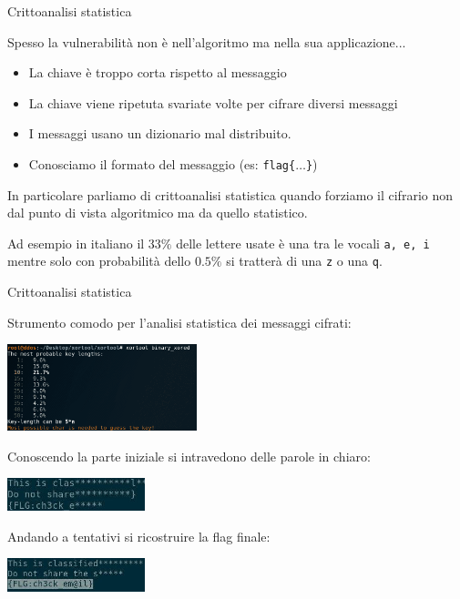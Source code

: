 \documentclass[handout, xcolor=dvipsnames,aspectratio=169]{beamer}
\begin{document}
\begin{frame}{Crittoanalisi statistica}

  \pause
  
  Spesso la vulnerabilità non è nell'algoritmo ma nella sua applicazione...
  
  \pause

  \medskip

  \begin{itemize}
    \item La chiave è troppo corta rispetto al messaggio
    \item La chiave viene ripetuta svariate volte per cifrare diversi messaggi
    \item I messaggi usano un dizionario mal distribuito.
    \item Conosciamo il formato del messaggio (es: \texttt{flag\{$\ldots$\}})
  \end{itemize}
  
  \medskip
  
  \pause

  In particolare parliamo di crittoanalisi statistica quando forziamo il cifrario non dal punto di vista algoritmico ma da quello statistico.
  
  \pause

  Ad esempio in italiano il $33\%$ delle lettere usate è una tra le vocali \texttt{a, e, i} mentre solo con probabilità dello $0.5\%$ si tratterà di una \texttt{z} o una \texttt{q}.


\end{frame}

\begin{frame}{Crittoanalisi statistica}
  
  \centering
  
  Strumento comodo per l'analisi statistica dei messaggi cifrati:

  \includegraphics[width=5.5cm]{img/xortool} 

  \pause
  
  Conoscendo la parte iniziale si intravedono delle parole in chiaro:
   
  \centering\includegraphics[width=4cm]{img/xor1} 

  Andando a tentativi si ricostruire la flag finale:
  
  
  \centering\includegraphics[width=4cm]{img/xor2} 
  
\end{frame}
\end{document}
